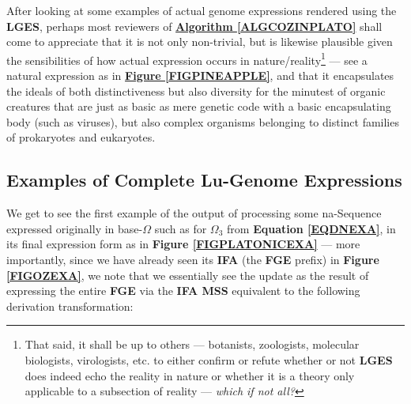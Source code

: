 \documentclass[a4paper, 18pt]{book} %
\begin{document}
After looking at some examples of actual genome expressions rendered using the \textbf{LGES}, perhaps most reviewers of \textbf{\hyperref[ALGCOZINPLATO]{Algorithm \ref{ALGCOZINPLATO}}} shall come to appreciate that it is not only non-trivial, but is likewise plausible given the sensibilities of how actual expression occurs in nature/reality\footnote{That said, it shall be up to others --- botanists, zoologists, molecular biologists, virologists, etc. to either confirm or refute whether or not \textbf{LGES} does indeed echo the reality in nature or whether it is a theory only applicable to a subsection of reality --- \textit{which if not all?}} --- see a natural expression as in \textbf{\hyperref[FIGPINEAPPLE]{Figure \ref{FIGPINEAPPLE}}}, and that it encapsulates the ideals of both distinctiveness but also diversity for the minutest of organic creatures that are just as basic as mere genetic code with a basic encapsulating body (such as viruses), but also complex organisms belonging to distinct families of prokaryotes and eukaryotes.


\subsection{Examples of Complete Lu-Genome Expressions}
\label{SECFULLGES}


We get to see the first example of the output of processing some na-Sequence expressed originally in base-$\Omega$ such as for $\Omega_{3}$ from \textbf{Equation \ref{EQDNEXA}}, in its final expression form as in \textbf{Figure \ref{FIGPLATONICEXA}}\cite{lutalo_2025_exa} --- more importantly, since we have already seen its \textbf{IFA} (the \textbf{FGE} prefix) in \textbf{Figure \ref{FIGOZEXA}}, we note that we essentially see the update as the result of expressing the entire \textbf{FGE} via the \textbf{IFA MSS} equivalent to the following derivation transformation:
\end{document}
